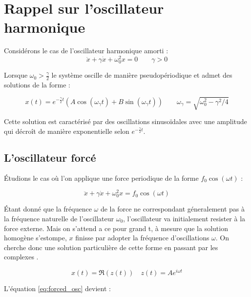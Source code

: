 \chapter{Rappel sur l'oscillateur harmonique}

Considérons le cas de l'oscillateur harmonique amorti :
\begin{dmath}
    \ddot{x} + \gamma\dot{x} + \omega_0^2 x = 0
    \qquad {\gamma > 0}
\end{dmath}   

Lorsque $\omega_0 > \frac{\gamma}{2}$ le système oscille de manière pseudopériodique et admet des solutions de la forme :

\begin{dmath}
    x(t) = e^{-\frac{\gamma}{2}t}(A\cos(\omega_{\gamma} t) + B\sin(\omega_{\gamma} t))
    \qquad {\omega_{\gamma} = \sqrt{\omega_0^2 - \gamma^2/4}}
\end{dmath}

Cette solution est caractérisé par des oscillations sinusoïdales avec une amplitude qui décroît de manière exponentielle selon $e^{-\frac{\gamma}{2} t}$.

\section{L'oscillateur forcé}

Étudions le cas où l’on applique une force periodique de la forme $f_0\cos(\omega t)$ :

\begin{dmath}
    \ddot{x} + \gamma\dot{x} + \omega_0^2 x = f_0\cos(\omega t)
    \label{eq:forced_osc}
\end{dmath}



Étant donné que la fréquence $\omega$ de la force ne correspondant 
géneralement pas à la fréquence naturelle de l'oscillateur $\omega_0$, 
l'oscillateur va initialement resister à la force externe.
Mais on s'attend a ce pour grand t, à mesure que la solution homogène s'estompe, $x$ finisse par adopter la 
fréquence d'oscillations $\omega$. 
On cherche donc une solution particulière de cette forme en passant 
par les complexes \cite{feynman_feynman_nodate}.

\begin{equation}
    x(t) = \Re(z(t)) \quad z(t) = Ae^{i\omega t}
\end{equation}

L'équation \eqref{eq:forced_osc} devient :

